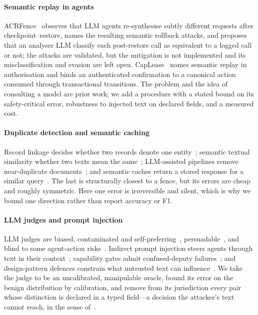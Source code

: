 \paragraph{Semantic replay in agents}
ACRFence~\cite{zheng2026acrfence} observes that LLM agents re-synthesise subtly different requests after checkpoint--restore, names the resulting semantic rollback attacks, and proposes that an analyser LLM classify each post-restore call as equivalent to a logged call or not; the attacks are validated, but the mitigation is not implemented and its misclassification and evasion are left open. CapLease~\cite{xu2026caplease} names semantic replay in authorisation and binds an authenticated confirmation to a canonical action consumed through transactional transitions. The problem and the idea of consulting a model are prior work; we add a procedure with a stated bound on its safety-critical error, robustness to injected text on declared fields, and a measured cost.

\paragraph{Duplicate detection and semantic caching}
Record linkage decides whether two records denote one entity~\cite{elmagarmid2007duplicate}; semantic textual similarity whether two texts mean the same~\cite{cer2017sts}; LLM-assisted pipelines remove near-duplicate documents~\cite{fang2026semhash}; and semantic caches return a stored response for a similar query~\cite{gill2025meancache}. The last is structurally closest to a fence, but its errors are cheap and roughly symmetric. Here one error is irreversible and silent, which is why we bound one direction rather than report accuracy or F1.

\paragraph{LLM judges and prompt injection}
LLM judges are biased, contaminated and self-preferring~\cite{zheng2023judge,wang2023fair,ye2024justice,chen2024humans,li2025leakage}, persuadable~\cite{hwang2025persuasion}, and blind to some agent-action risks~\cite{yuan2024rjudge,ruan2024toolemu}. Indirect prompt injection steers agents through text in their context~\cite{greshake2023injection,debenedetti2024agentdojo}; capability gates admit confused-deputy failures~\cite{zuvic2026confused}; and design-pattern defences constrain what untrusted text can influence~\cite{beurerkellner2025patterns}. We take the judge to be an uncalibrated, manipulable oracle, bound its error on the benign distribution by calibration, and remove from its jurisdiction every pair whose distinction is declared in a typed field---a decision the attacker's text cannot reach, in the sense of~\cite{beurerkellner2025patterns}.

